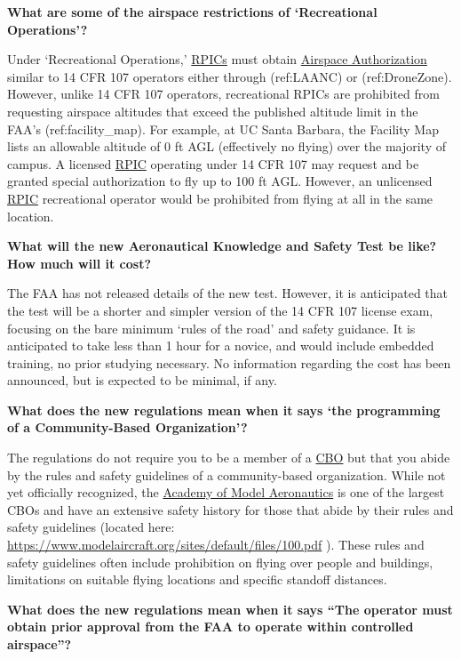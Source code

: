 \documentclass[
]{book}
\begin{document}
\textbf{What are some of the airspace restrictions of `Recreational Operations'?}

Under `Recreational Operations,' \protect\hyperlink{RPIC}{RPICs} must obtain \protect\hyperlink{AA}{Airspace Authorization} similar to 14 CFR 107 operators either through (ref:LAANC) or (ref:DroneZone). However, unlike 14 CFR 107 operators, recreational RPICs are prohibited from requesting airspace altitudes that exceed the published altitude limit in the FAA's (ref:facility\_map). For example, at UC Santa Barbara, the Facility Map lists an allowable altitude of 0 ft AGL (effectively no flying) over the majority of campus. A licensed \protect\hyperlink{RPIC}{RPIC} operating under 14 CFR 107 may request and be granted special authorization to fly up to 100 ft AGL. However, an unlicensed \protect\hyperlink{RPIC}{RPIC} recreational operator would be prohibited from flying at all in the same location.

\textbf{What will the new Aeronautical Knowledge and Safety Test be like? How much will it cost?}

The FAA has not released details of the new test. However, it is anticipated that the test will be a shorter and simpler version of the 14 CFR 107 license exam, focusing on the bare minimum `rules of the road' and safety guidance. It is anticipated to take less than 1 hour for a novice, and would include embedded training, no prior studying necessary. No information regarding the cost has been announced, but is expected to be minimal, if any.

\textbf{What does the new regulations mean when it says `the programming of a Community-Based Organization'?}

The regulations do not require you to be a member of a \protect\hyperlink{CBO}{CBO} but that you abide by the rules and safety guidelines of a community-based organization. While not yet officially recognized, the \protect\hyperlink{AMA}{Academy of Model Aeronautics} is one of the largest CBOs and have an extensive safety history for those that abide by their rules and safety guidelines (located here: \url{https://www.modelaircraft.org/sites/default/files/100.pdf} ). These rules and safety guidelines often include prohibition on flying over people and buildings, limitations on suitable flying locations and specific standoff distances.

\textbf{What does the new regulations mean when it says ``The operator must obtain prior approval from the FAA to operate within controlled airspace''?}
\end{document}
